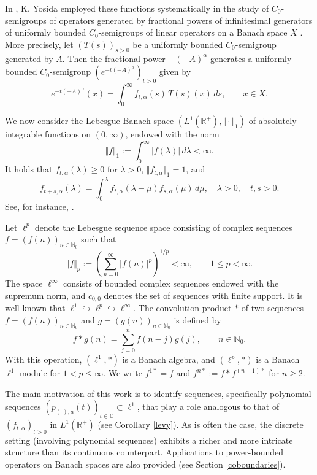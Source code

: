 \documentclass[a4paper,12pt]{amsart}
\def\N{\mathbb N}
\def\CC{\mathbb C}
\def\CC{\mathbb C}
\def\R{\mathbb R}
\theoremstyle{definition}
\theoremstyle{remark}
\begin{document}
In \cite[Section IX.11]{Yo80}, K. Yosida employed these functions systematically in the study of $C_0$-semigroups of operators generated by fractional powers of infinitesimal generators of uniformly bounded $C_0$-semigroups of linear operators on a Banach space $X$ . More precisely, let $(T(s))_{s>0}$ be a uniformly bounded $C_0$-semigroup generated by $A$. Then the fractional power $-(-A)^\alpha$ generates a uniformly bounded $C_0$-semigroup $(e^{-t(-A)^\alpha})_{t>0}$ given by
\begin{equation}\label{yosid}
e^{-t(-A)^\alpha}(x)=\int_0^\infty f_{t,\alpha}(s) \, T(s)(x)\, ds, \qquad x\in X.
\end{equation}

We now consider the Lebesgue Banach space $(L^1(\R^+),\Vert \cdot \Vert_1)$ of absolutely integrable functions on $(0,\infty)$, endowed with the norm
$$
\Vert f \Vert_1:=\int_0^\infty \vert f(\lambda)\vert \, d\lambda<\infty.
$$
It holds that $ f_{t,\alpha}(\lambda) \geq 0$ for $\lambda >0$, $\Vert f_{t,\alpha} \Vert_1=1$, and
$$
f_{t+s,\alpha} (\lambda)= \int_0^{\lambda} f_{t,\alpha}(\lambda -\mu)f_{s,\alpha}(\mu)\, d\mu, \quad \lambda >0, \quad t,s>0.
$$
See, for instance, \cite{Yo80}.

Let $\ell^p$ denote the Lebesgue sequence space consisting of complex sequences $f=(f(n))_{n\in\N_0}$ such that
$$
\Vert f\Vert_p:=\left(\sum_{n=0}^{\infty}\lvert f(n)\rvert^p\right)^{1/p}<\infty, \qquad 1\le p<\infty.
$$
The space $\ell^\infty$ consists of bounded complex sequences endowed with the supremum norm, and $c_{0,0}$ denotes the set of sequences with finite support. It is well known that $\ell^1 \hookrightarrow \ell^p \hookrightarrow \ell^\infty$. The convolution product $\ast$ of two sequences $f=(f(n))_{n\in\N_0}$ and $g=(g(n))_{n\in\N_0}$ is defined by
$$
f\ast g(n)=\sum_{j=0}^n f(n-j) g(j), \qquad n\in \N_0.
$$
With this operation, $(\ell^1, \ast)$ is a Banach algebra, and $(\ell^p, \ast)$ is a Banach $\ell^1$-module for $1<p\le \infty$. We write $f^{1\ast}= f$ and $f^{n\ast}:=f\ast f^{(n-1)\ast}$ for $n\ge 2$.

The main motivation of this work is to identify sequences, specifically polynomial sequences $(p_{(\cdot);a}(t))_{t\in \CC}\subset \ell^1$, that play a role analogous to that of $(f_{t,\alpha})_{t>0}$ in $L^1(\R^+)$ (see Corollary \ref{levy}). As is often the case, the discrete setting (involving polynomial sequences) exhibits a richer and more intricate structure than its continuous counterpart. Applications to power-bounded operators on Banach spaces are also provided (see Section \ref{coboundaries}).
\end{document}

